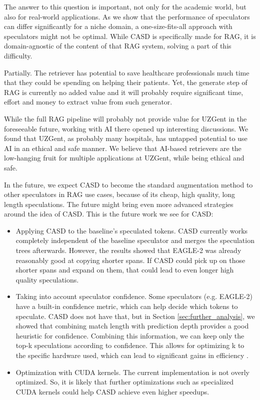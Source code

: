 The answer to this question is important, not only for the academic world, but also for real-world applications. As we show that the performance of speculators can differ significantly for a niche domain, a one-size-fits-all approach with speculators might not be optimal. While CASD is specifically made for RAG, it is domain-agnostic of the content of that RAG system, solving a part of this difficulty.

\begin{tcolorbox}[colback=blue-ish-light,colframe=blue-ish,title=\textbf{RQ3:} Can a RAG system provide additional value at UZGent?, coltitle=white]
    Partially. The retriever has potential to save healthcare professionals much time that they could be spending on helping their patients. Yet, the generate step of RAG is currently no added value and it will probably require significant time, effort and money to extract value from such generator.
\end{tcolorbox}

While the full RAG pipeline will probably not provide value for UZGent in the foreseeable future, working with AI there opened up interesting discussions. We found that UZGent, as probably many hospitals, has untapped potential to use AI in an ethical and safe manner. We believe that AI-based retrievers are the low-hanging fruit for multiple applications at UZGent, while being ethical and safe.

In the future, we expect CASD to become the standard augmentation method to other speculators in RAG use cases, because of its cheap, high quality, long length speculations. The future might bring even more advanced strategies around the idea of CASD. This is the future work we see for CASD:
\begin{itemize}
    \item Applying CASD to the baseline's speculated tokens. CASD currently works completely independent of the baseline speculator and merges the speculation trees afterwards. However, the results showed that EAGLE-2 was already reasonably good at copying shorter spans. If CASD could pick up on those shorter spans and expand on them, that could lead to even longer high quality speculations.
    \item Taking into account speculator confidence. Some speculators (e.g. EAGLE-2) have a built-in confidence metric, which can help decide which tokens to speculate. CASD does not have that, but in Section \ref{sec:further_analysis}, we showed that combining match length with prediction depth provides a good heuristic for confidence. Combining this information, we can keep only the top-k speculations according to confidence. This allows for optimizing k to the specific hardware used, which can lead to significant gains in efficiency \cite{fernandez2025energy}.
    \item Optimization with CUDA kernels. The current implementation is not overly optimized. So, it is likely that further optimizations such as specialized CUDA kernels could help CASD achieve even higher speedups.
\end{itemize}

